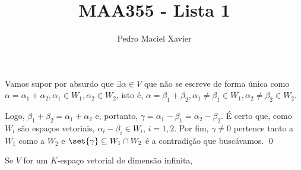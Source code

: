 \documentclass[brazil]{homework}
\title{MAA355 - Lista 1}
\author{Pedro Maciel Xavier}
\begin{document}
    \maketitle*%


    \begin{answer}
        Vamos supor por absurdo que $\exists \alpha \in V$ que não se escreve de forma única como $\alpha = \alpha_1 + \alpha_2, \alpha_1 \in W_1, \alpha_2 \in W_2$,
        isto é, $\alpha = \beta_1 + \beta_2, \alpha_1 \neq \beta_1 \in W_1, \alpha_2 \neq \beta_2 \in W_2$.

        Logo, $\beta_1 + \beta_2 = \alpha_1 + \alpha_2$ e, portanto, $\gamma = \alpha_1 - \beta_1 = \alpha_2 - \beta_2$. É certo que, como $W_i$ são espaços vetoriais, $\alpha_i - \beta_i \in W_i$, $i = 1, 2$. Por fim, $\gamma \neq 0$ pertence tanto a $W_1$ como a $W_2$ e $\set{\gamma} \subseteq W_1 \cap W_2$ é a contradição que buscávamos. \qed
    \end{answer}


    \begin{answer}
        Se $V$ for um $K$-espaço vetorial de dimensão infinita, 
    \end{answer}

\end{document}
